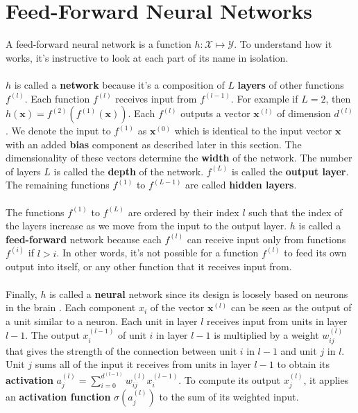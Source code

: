 \section{Feed-Forward Neural Networks}
A feed-forward neural network is a function $h: \mathcal{X} \mapsto \mathcal{Y}$. To understand how it works, it's instructive to look at each part of its name in isolation.
\\\\
$h$ is called a \textbf{network} because it's a composition of $L$ \textbf{layers} of other functions $f^{(l)}$. Each function $f^{(l)}$ receives input from $f^{(l-1)}$. For example if $L = 2$, then $h(\mathbf{x}) = f^{(2)}(f^{(1)}(\mathbf{x}))$. Each $f^{(l)}$ outputs a vector $\mathbf{x}^{(l)}$ of dimension $d^{(l)}$.  We denote the input to $f^{(1)}$ as $\mathbf{x}^{(0)}$ which is identical to the input vector $\mathbf{x}$ with an added \textbf{bias} component as described later in this section. The dimensionality of these vectors determine the \textbf{width} of the network. The number of layers $L$ is called the \textbf{depth} of the network. $f^{(L)}$ is called the \textbf{output layer}. The remaining functions $f^{(1)}$ to $f^{(L-1)}$ are called \textbf{hidden layers}. 
\\\\
The functions $f^{(1)}$ to $f^{(L)}$ are ordered by their index $l$ such that the index of the layers increase as we move from the input to the output layer. $h$ is called a \textbf{feed-forward} network because each $f^{(l)}$ can receive input only from functions $f^{(i)}$ if $l > i$. In other words, it's not possible for a function $f^{(l)}$ to feed its own output into itself, or any other function that it receives input from.
\\\\
Finally, $h$ is called a \textbf{neural} network since its design is loosely based on neurons in the brain \citep{goodfellow16}. Each component $x_i$ of the vector $\mathbf{x}^{(l)}$ can be seen as the output of a unit similar to a neuron. Each unit in layer $l$ receives input from units in layer $l-1$. The output $x^{(l-1)}_i$ of unit $i$ in layer $l-1$ is multiplied by a weight $w^{(l)}_{ij}$ that gives the strength of the connection between unit $i$ in $l-1$ and unit $j$ in $l$. Unit $j$ sums all of the input it receives from units in layer $l-1$ to obtain its \textbf{activation} $a^{(l)}_j = \sum_{i=0}^{d^{(l-1)}} w^{(l)}_{ij}x^{(l-1)}_{i}$. To compute its output $x^{(l)}_j$, it applies an \textbf{activation function} $\sigma(a^{(l)}_j)$ to the sum of its weighted input.

